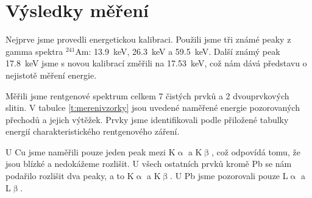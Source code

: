 \section*{Výsledky měření}
Nejprve jsme provedli energetickou kalibraci. Použili jsme tři známé peaky z gamma spektra $^{241}$Am: \SI{13.9}{\keV}, \SI{26.3}{\keV} a \SI{59.5}{\keV}. Další známý peak \SI{17.8}{\keV} jsme s novou kalibrací změřili na \SI{17.53}{\keV}, což nám dává představu o nejistotě měření energie.

Měřili jsme rentgenové spektrum celkem 7 čistých prvků a 2 dvouprvkových slitin. V tabulce \ref{t:merenivzorky} jsou uvedené naměřené energie pozorovaných přechodů a jejich výtěžek. Prvky jsme identifikovali podle přiložené tabulky energií charakteristického rentgenového záření.

U Cu jsme naměřili pouze jeden peak mezi K$\upalpha$ a K$\upbeta$, což odpovídá tomu, že jsou blízké a nedokážeme rozlišit. U všech ostatních prvků kromě Pb se nám podařilo rozlišit dva peaky, a to K$\upalpha$ a K$\upbeta$. U Pb jsme pozorovali pouze L$\upalpha$ a L$\upbeta$.

